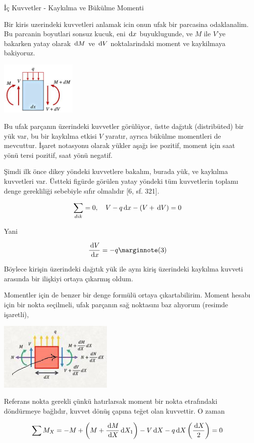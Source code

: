 \documentclass[12pt,fleqn]{article}\usepackage{../../common}
\begin{document}
İç Kuvvetler - Kaykılma ve Bükülme Momenti

Bir kiris uzerindeki kuvvetleri anlamak icin onun ufak bir parcasina
odaklanalim. Bu parcanin boyutlari sonsuz kucuk, eni $\,\mathrm{d} x$ buyuklugunde,
ve $M$ ile $V$'ye bakarken yatay olarak $\,\mathrm{d} M$ ve $\,\mathrm{d} V$ noktalarindaki
moment ve kaykilmaya bakiyoruz. 

\includegraphics[width=10em]{phy_020_strs_02_10.jpg}

Bu ufak parçanın üzerindeki kuvvetler görülüyor, üstte dağıtık (distribüted) bir
yük var, bu bir kaykılma etkisi $V$ yaratır, ayrıca bükülme momentleri de
mevcuttur. İşaret notasyonu olarak yükler aşağı ise pozitif, moment için
saat yönü tersi pozitif, saat yönü negatif.

Şimdi ilk önce dikey yöndeki kuvvetlere bakalım, burada yük, ve kaykılma
kuvvetleri var. Üstteki figürde görülen yatay yöndeki tüm kuvvetlerin toplamı
denge gerekliliği sebebiyle sıfır olmalıdır [6, sf. 321].

$$
\sum_{dik} = 0, \quad V - q \,\mathrm{d} x - (V + \,\mathrm{d} V) = 0
$$

Yani

$$
\frac{\ud V}{\ud x} = -q
\mlabel{3}
$$

Böylece kirişin üzerindeki dağıtık yük ile aynı kiriş üzerindeki kaykılma
kuvveti arasında bir ilişkiyi ortaya çıkarmış oldum. 

Momentler için de benzer bir denge formülü ortaya çıkartabilirim. Moment hesabı
için bir nokta seçilmeli, ufak parçanın sağ noktasını baz alıyorum (resimde
işaretli),

\includegraphics[width=15em]{phy_020_strs_02_11.jpg}

Referans nokta gerekli çünkü hatırlarsak moment bir nokta etrafındaki
döndürmeye bağlıdır, kuvvet dönüş çapına teğet olan kuvvettir. O zaman 

$$
\sum M_{X} = -M + \left( M + \frac{\,\mathrm{d} M}{\,\mathrm{d} X} \,\mathrm{d} X_1 \right) -
V \,\mathrm{d} X - q \,\mathrm{d} X \left( \frac{\,\mathrm{d} X}{2}  \right) = 0
$$
\end{document}
